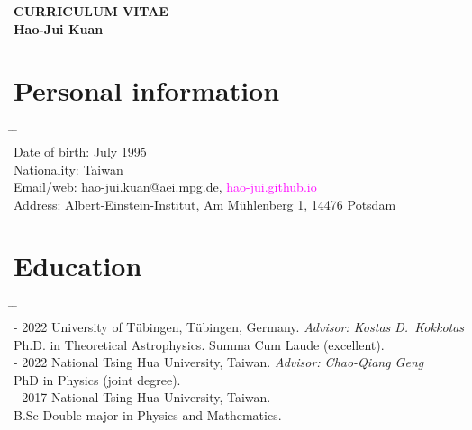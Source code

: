 \documentclass[10pt,floatfix,a4paper]{article}
\begin{document}
\begin{center}
  {\LARGE \bf CURRICULUM VITAE} \\[2ex]
  {\Large \bf Hao-Jui Kuan}
\end{center}


\section*{Personal information}
\begin{tabbing}
  \hspace*{5mm} \= \hspace*{2.3cm} \= \hspace*{10cm} \\[-3ex]
  \> Date of birth\hspace{1.2mm}:   July 1995\\
  \> Nationality\hspace{4mm}: \> Taiwan\\
  \> Email/web\hspace{4.3mm}: \> hao-jui.kuan@aei.mpg.de, \href{https://hao-jui.github.io}{\textcolor{magenta}{hao-jui.github.io}}\\
  \> Address\hspace{8.7mm}: \> Albert-Einstein-Institut, Am M{\"u}hlenberg 1, 14476 Potsdam
\end{tabbing}

\section*{Education}
\begin{tabbing}
  \hspace*{5mm} \= \hspace*{2.3cm} \= \hspace*{10cm} \\[-3ex]
   - 2022 \>  University of T{\"u}bingen, T\"ubingen, Germany. \textit{Advisor: Kostas D.~Kokkotas} \\
  \> \> Ph.D. in Theoretical Astrophysics.  Summa Cum Laude (excellent). \\[1ex]
   - 2022 \> National Tsing Hua University, Taiwan. \textit{Advisor: Chao-Qiang Geng} \\
  \> \> PhD in Physics (joint degree). \\[1ex]
   - 2017 \> National Tsing Hua University, Taiwan. \\
  \> \> B.Sc Double major in Physics and Mathematics.
\end{tabbing}
\end{document}
